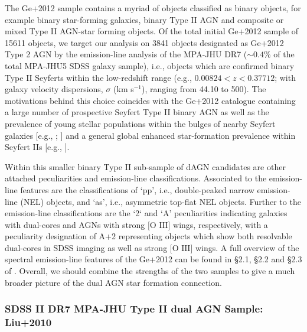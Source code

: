 The Ge+2012 sample contains a myriad of objects classified as binary objects, for example binary star-forming galaxies, binary Type II AGN and composite or mixed Type II AGN-star forming objects. Of the total initial Ge+2012 sample of 15611 objects, we target our analysis on 3841 objects designated as Ge+2012 Type 2 AGN by the emission-line analysis of the MPA-JHU DR7 ($\sim{0.4}$\% of the total MPA-JHU5 SDSS galaxy sample), i.e., objects which are confirmed binary Type II Seyferts within the low-redshift range (e.g., ${0.00824}<{z}<{0.37712}$; with galaxy velocity dispersions, $\sigma$ (km s$^{-1}$), ranging from 44.10 to 500). The motivations behind this choice coincides with the Ge+2012 catalogue containing a large number of prospective Seyfert Type II binary AGN as well as the prevalence of young stellar populations within the bulges of nearby Seyfert galaxies [e.g., \cite{1990MNRAS.242..271T}; \cite{Delgado_2001}] and a general global enhanced star-formation prevalence within Seyfert IIs [e.g., \cite{2006MNRAS.366..480G}].  

Within this smaller binary Type II sub-sample of dAGN candidates are other attached peculiarities and emission-line classifications. Associated to the emission-line features are the classifications of `pp', i.e., double-peaked narrow emission-line (NEL) objects, and `as', i.e., asymmetric top-flat NEL objects. Further to the emission-line classifications are the `2` and `A' peculiarities indicating galaxies with dual-cores and AGNs with strong $\text{[O III]}$ wings, respectively, with a peculiarity designation of A+2 representing objects which show both resolvable dual-cores in SDSS imaging as well as strong $\text{[O III]}$ wings. A full overview of the spectral emission-line features of the Ge+2012 can be found in §2.1, §2.2 and §2.3 of \cite{Ge_Hu_Wang_Bai_Zhang_2012}. Overall, we should combine the strengths of the two samples to give a much broader picture of the dual AGN star formation connection.

\subsubsection{SDSS II DR7 MPA-JHU Type II dual AGN Sample: Liu+2010}

